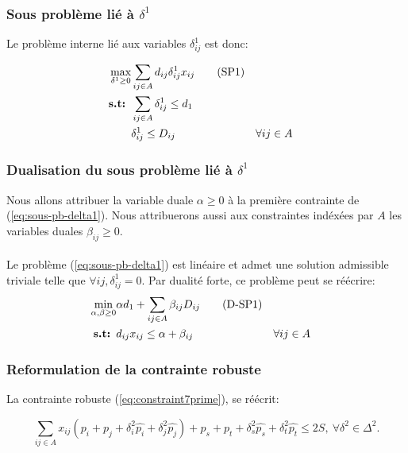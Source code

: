 \documentclass{article}
\begin{document}
\subsubsection{Sous problème lié à $\delta^{1}$}

Le problème interne lié aux variables $\delta^{1}_{ij}$ est donc:

\begin{align}
  \max_{\delta^{1}\geq 0} & \sum_{ij \in A} d_{ij} \delta_{ij}^{1} x_{ij} \tag{SP1} \label{eq:sous-pb-delta1}  \\
  \textbf{s.t: } &\sum_{ij \in A} \delta_{ij}^{1} \leq d_1 \notag \\
  &\delta_{ij}^{1} \leq D_{ij} && \forall ij \in A \notag
\end{align}

\subsubsection{Dualisation du sous problème lié à $\delta^{1}$}

Nous allons attribuer la variable duale $\alpha \geq 0$ à la première contrainte de (\ref{eq:sous-pb-delta1}). Nous attribuerons aussi aux constraintes indéxées par $A$ les variables duales $\beta_{ij} \geq 0$.
\\
\\
Le problème (\ref{eq:sous-pb-delta1}) est linéaire et admet une solution admissible triviale telle que $\forall ij, \delta^{1}_{ij} = 0$. Par dualité forte, ce problème peut se réécrire:
\begin{align}
  \min_{\alpha, \beta \geq 0} & \alpha d_1  + \sum_{ij \in A} \beta_{ij} D_{ij} \tag{D-SP1} \label{eq:dual-sous-pb-delta1}  \\
  \textbf{s.t: } &d_{ij} x_{ij} \leq \alpha + \beta_{ij} && \forall ij \in A \notag
\end{align}

\subsubsection{Reformulation de la contrainte robuste}

La contrainte robuste (\ref{eq:constraint7prime}), se réécrit:

\begin{equation}
\label{eq:ref_contrainte_robuste}
  \sum_{ij \in A} x_{ij}(p_i + p_j + \delta_{i}^{2} \hat{p_i} + \delta_{j}^{2} \hat{p_j}) + p_s + p_t + \delta_{s}^{2} \hat{p_s} + \delta_{t}^{2} \hat{p_t} \leq 2S,\ \forall \delta^{2} \in \Delta^{2}.
\end{equation}
\end{document}
